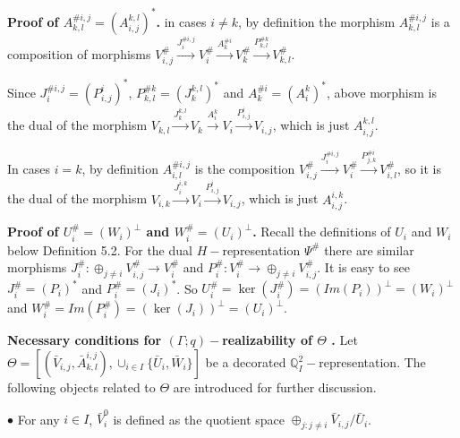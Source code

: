 \def\CTEXPreproc{Created by ctex v0.2.12, don't edit!}\documentclass[11pt]{article}
\begin{document}
  \begin{pf}
  \noindent \textbf{Proof of $ A^{\# i,j}_{k,l}= ( A^{k,l}_{i,j}  )^{*}  $.} in cases $i\neq k$, by definition the morphism $A^{\# i,j}_{k,l}$ is a composition of morphisms $V^{\#}_{i,j}  \stackrel{ J^{\# i,j} _i }{\longrightarrow} V^{\#}_i   \stackrel{ A^{\# i}_k  }{\longrightarrow}  V^{\#}_k
   \stackrel{ P^{\# k}_{k,l} }{\longrightarrow} V^{\# }_{k,l}  $.

   Since $ J^{\# i,j} _i =( P^i _{i,j} )^* $, $ P^{\# k}_{k,l} = ( J^{k,l} _k  )^* $ and $ A^{\# i}_k = ( A^k _i )^* $, above morphism is the dual of the morphism  $ V_{k,l}  \stackrel{J^{k,l}_k  }{\longrightarrow}   V_k  \stackrel{ A^k _i  }{\longrightarrow}    V_i
    \stackrel{ P^i _{i,j}  }{\longrightarrow}   V_{i,j}  $,  which is just $ A^{k,l} _{i,j} $.

    In cases $i=k$, by definition $ A^{\# i,j } _{i,l} $ is the composition
    $ V^{\#} _{i,j}  \stackrel{ J^{\# i,j}_i  }{\longrightarrow}   V^{\#}_i   \stackrel{P^{\# i}_{j,k}  }{\longrightarrow}  V^{\#}_{i,l}  $, so it is the dual of the morphism
    $ V_{i,k}  \stackrel{ J^{i,k}_i }{\longrightarrow}   V_i  \stackrel{ P^i _{i,j} }{\longrightarrow}   V_{i,j} $, which is just
    $A^{i,k}_{i,j} $.

    \noindent \textbf{ Proof of $ U^{\#}_i = ( W_i )^{\perp}  $ and $W^{\#}_i = (U_i )^{\perp}  $.} Recall the definitions of $U_i$ and $W_i$ below Definition 5.2. For the dual $H-$representation $\Psi^{\#}$ there are similar
    morphisms $J^{\#} _i  : \oplus_{j\neq i} V^{\#} _{i,j} \longrightarrow V^{\#}_i $ and
     $P^{\#}_i : V^{\#}_i \longrightarrow \oplus_{j\neq i} V^{\#}_{i,j} $. It is easy to see $ J^{\#}_i = ( P_i )^* $ and
     $ P^{\#}_i = ( J_i )^* $. So $U^{\#}_i = \ker (  J^{\#} _i    ) = ( Im (  P_i ) )^{\perp} = ( W_i )^{\perp} $ and
     $  W^{\# }_i = Im ( P^{\#} _i )= ( \ker ( J_i ) )^{\perp}  = (U_i )^{\perp}. $\\


  \end{pf}


\noindent \textbf{Necessary conditions for $(\Gamma;q)-$realizability of $\Theta$ .}
 Let $\Theta= [ ( \bar{V}_{i,j} , \bar{A}^{i,j}_{k,l} ) ,  \cup_{i\in I} \{ \bar{U}_i ,\bar{W}_i \}    ] $ be a decorated $\mathbb{Q}^2 _I -$representation. The following objects related to $\Theta$ are introduced for further discussion.

 \noindent $\bullet$ For any $i\in I$,  $\bar{V}^0 _i $ is defined as the quotient space $ \oplus_{j: j\neq i} \bar{V}_{i,j} /  \bar{U}_i  $.
\end{document}
